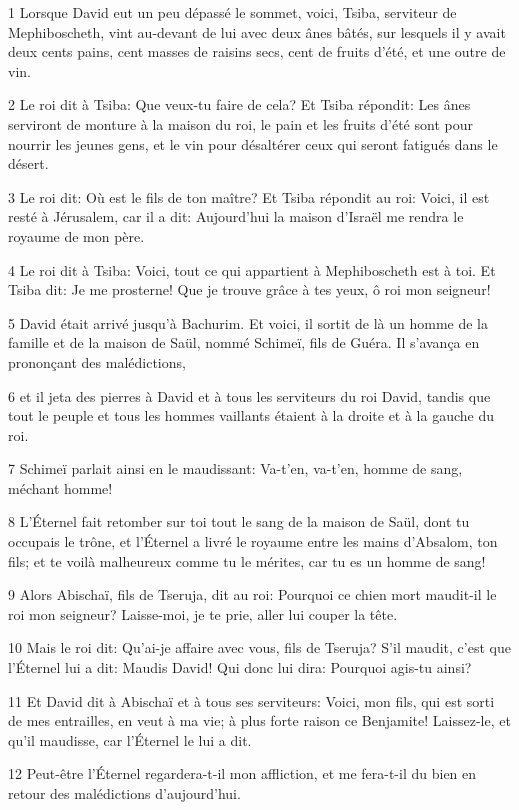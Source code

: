 \par 1 Lorsque David eut un peu dépassé le sommet, voici, Tsiba, serviteur de Mephiboscheth, vint au-devant de lui avec deux ânes bâtés, sur lesquels il y avait deux cents pains, cent masses de raisins secs, cent de fruits d'été, et une outre de vin.
\par 2 Le roi dit à Tsiba: Que veux-tu faire de cela? Et Tsiba répondit: Les ânes serviront de monture à la maison du roi, le pain et les fruits d'été sont pour nourrir les jeunes gens, et le vin pour désaltérer ceux qui seront fatigués dans le désert.
\par 3 Le roi dit: Où est le fils de ton maître? Et Tsiba répondit au roi: Voici, il est resté à Jérusalem, car il a dit: Aujourd'hui la maison d'Israël me rendra le royaume de mon père.
\par 4 Le roi dit à Tsiba: Voici, tout ce qui appartient à Mephiboscheth est à toi. Et Tsiba dit: Je me prosterne! Que je trouve grâce à tes yeux, ô roi mon seigneur!
\par 5 David était arrivé jusqu'à Bachurim. Et voici, il sortit de là un homme de la famille et de la maison de Saül, nommé Schimeï, fils de Guéra. Il s'avança en prononçant des malédictions,
\par 6 et il jeta des pierres à David et à tous les serviteurs du roi David, tandis que tout le peuple et tous les hommes vaillants étaient à la droite et à la gauche du roi.
\par 7 Schimeï parlait ainsi en le maudissant: Va-t'en, va-t'en, homme de sang, méchant homme!
\par 8 L'Éternel fait retomber sur toi tout le sang de la maison de Saül, dont tu occupais le trône, et l'Éternel a livré le royaume entre les mains d'Absalom, ton fils; et te voilà malheureux comme tu le mérites, car tu es un homme de sang!
\par 9 Alors Abischaï, fils de Tseruja, dit au roi: Pourquoi ce chien mort maudit-il le roi mon seigneur? Laisse-moi, je te prie, aller lui couper la tête.
\par 10 Mais le roi dit: Qu'ai-je affaire avec vous, fils de Tseruja? S'il maudit, c'est que l'Éternel lui a dit: Maudis David! Qui donc lui dira: Pourquoi agis-tu ainsi?
\par 11 Et David dit à Abischaï et à tous ses serviteurs: Voici, mon fils, qui est sorti de mes entrailles, en veut à ma vie; à plus forte raison ce Benjamite! Laissez-le, et qu'il maudisse, car l'Éternel le lui a dit.
\par 12 Peut-être l'Éternel regardera-t-il mon affliction, et me fera-t-il du bien en retour des malédictions d'aujourd'hui.
